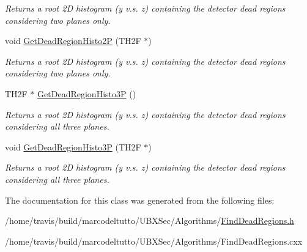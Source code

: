 \begin{DoxyCompactItemize}
\begin{DoxyCompactList}\small\item\em \-Returns a root 2\-D histogram (y v.\-s. z) containing the detector dead regions considering two planes only. \end{DoxyCompactList}\item 
\hypertarget{classFindDeadRegions_a93fcf74bb534831495f50a79fede19f9}{void \hyperlink{classFindDeadRegions_a93fcf74bb534831495f50a79fede19f9}{\-Get\-Dead\-Region\-Histo2\-P} (\-T\-H2\-F $\ast$)}\label{classFindDeadRegions_a93fcf74bb534831495f50a79fede19f9}

\begin{DoxyCompactList}\small\item\em \-Returns a root 2\-D histogram (y v.\-s. z) containing the detector dead regions considering two planes only. \end{DoxyCompactList}\item 
\hypertarget{classFindDeadRegions_abb378991861e7fdef4cd94a27d52ec07}{\-T\-H2\-F $\ast$ \hyperlink{classFindDeadRegions_abb378991861e7fdef4cd94a27d52ec07}{\-Get\-Dead\-Region\-Histo3\-P} ()}\label{classFindDeadRegions_abb378991861e7fdef4cd94a27d52ec07}

\begin{DoxyCompactList}\small\item\em \-Returns a root 2\-D histogram (y v.\-s. z) containing the detector dead regions considering all three planes. \end{DoxyCompactList}\item 
\hypertarget{classFindDeadRegions_a50de57c6d1792a6f2a93df8a44ba840a}{void \hyperlink{classFindDeadRegions_a50de57c6d1792a6f2a93df8a44ba840a}{\-Get\-Dead\-Region\-Histo3\-P} (\-T\-H2\-F $\ast$)}\label{classFindDeadRegions_a50de57c6d1792a6f2a93df8a44ba840a}

\begin{DoxyCompactList}\small\item\em \-Returns a root 2\-D histogram (y v.\-s. z) containing the detector dead regions considering all three planes. \end{DoxyCompactList}\end{DoxyCompactItemize}


\-The documentation for this class was generated from the following files\-:\begin{DoxyCompactItemize}
\item 
/home/travis/build/marcodeltutto/\-U\-B\-X\-Sec/\-Algorithms/\hyperlink{FindDeadRegions_8h}{\-Find\-Dead\-Regions.\-h}\item 
/home/travis/build/marcodeltutto/\-U\-B\-X\-Sec/\-Algorithms/\-Find\-Dead\-Regions.\-cxx\end{DoxyCompactItemize}
